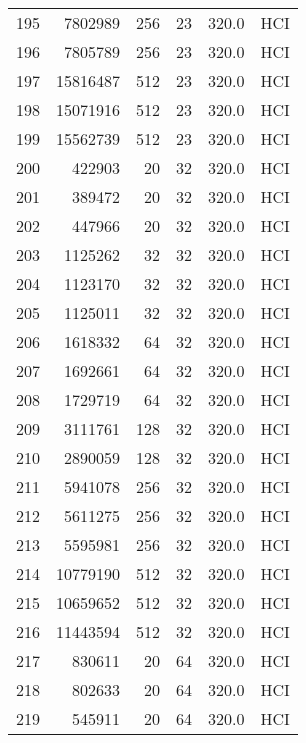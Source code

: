 \begin{longtable}{lrrrrl}
195 &   7802989 &        256 &        23 &          320.0 &  HCI \\
196 &   7805789 &        256 &        23 &          320.0 &  HCI \\
197 &  15816487 &        512 &        23 &          320.0 &  HCI \\
198 &  15071916 &        512 &        23 &          320.0 &  HCI \\
199 &  15562739 &        512 &        23 &          320.0 &  HCI \\
200 &    422903 &         20 &        32 &          320.0 &  HCI \\
201 &    389472 &         20 &        32 &          320.0 &  HCI \\
202 &    447966 &         20 &        32 &          320.0 &  HCI \\
203 &   1125262 &         32 &        32 &          320.0 &  HCI \\
204 &   1123170 &         32 &        32 &          320.0 &  HCI \\
205 &   1125011 &         32 &        32 &          320.0 &  HCI \\
206 &   1618332 &         64 &        32 &          320.0 &  HCI \\
207 &   1692661 &         64 &        32 &          320.0 &  HCI \\
208 &   1729719 &         64 &        32 &          320.0 &  HCI \\
209 &   3111761 &        128 &        32 &          320.0 &  HCI \\
210 &   2890059 &        128 &        32 &          320.0 &  HCI \\
211 &   5941078 &        256 &        32 &          320.0 &  HCI \\
212 &   5611275 &        256 &        32 &          320.0 &  HCI \\
213 &   5595981 &        256 &        32 &          320.0 &  HCI \\
214 &  10779190 &        512 &        32 &          320.0 &  HCI \\
215 &  10659652 &        512 &        32 &          320.0 &  HCI \\
216 &  11443594 &        512 &        32 &          320.0 &  HCI \\
217 &    830611 &         20 &        64 &          320.0 &  HCI \\
218 &    802633 &         20 &        64 &          320.0 &  HCI \\
219 &    545911 &         20 &        64 &          320.0 &  HCI \\

\end{longtable}
